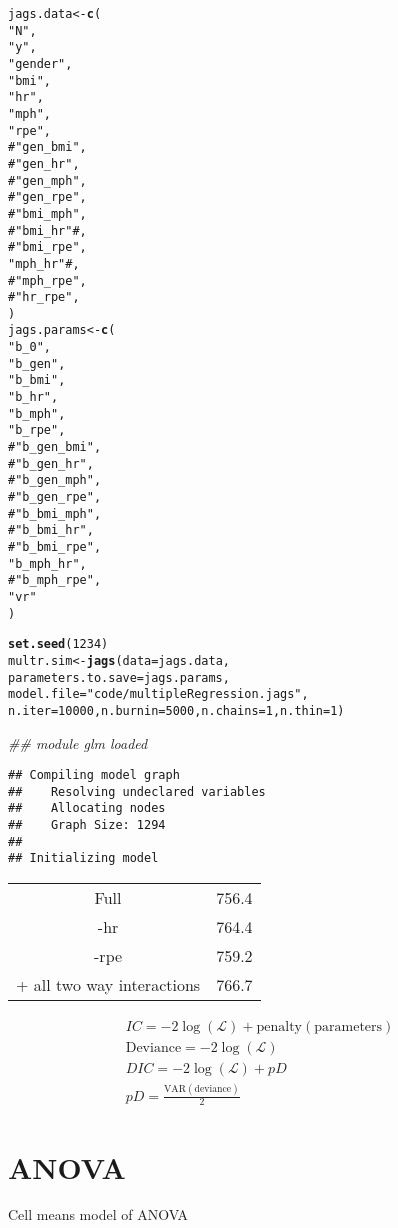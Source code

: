\documentclass[12pt,letterpaper,oneside]{article}\usepackage{graphicx, color}
\makeatletter
\newcommand{\hlfunctioncall}[1]{\textcolor[rgb]{0.501960784313725,0,0.329411764705882}{\textbf{#1}}}%
\newcommand{\hlstring}[1]{\textcolor[rgb]{0.6,0.6,1}{#1}}%
\newcommand{\hlcomment}[1]{\textcolor[rgb]{0.180392156862745,0.6,0.341176470588235}{#1}}%
\newenvironment{kframe}{%
 \def\at@end@of@kframe{}%
 \ifinner\ifhmode%
  \def\at@end@of@kframe{\end{minipage}}%
  \begin{minipage}{\columnwidth}%
 \fi\fi%
 \def\FrameCommand##1{\hskip\@totalleftmargin \hskip-\fboxsep
 \colorbox{shadecolor}{##1}\hskip-\fboxsep
     \hskip-\linewidth \hskip-\@totalleftmargin \hskip\columnwidth}%
 \MakeFramed {\advance\hsize-\width
   \@totalleftmargin\z@ \linewidth\hsize
   \@setminipage}}%
 {\par\unskip\endMakeFramed%
 \at@end@of@kframe}
\newenvironment{knitrout}{}{} %
\makeatother
\begin{document}
\begin{knitrout}
\begin{kframe}
\begin{alltt}
jags.data <- \hlfunctioncall{c}(
\hlstring{"N"},
\hlstring{"y"},
\hlstring{"gender"},
\hlstring{"bmi"},
\hlstring{"hr"},
\hlstring{"mph"},
\hlstring{"rpe"},
\hlcomment{# "gen_bmi",}
\hlcomment{# "gen_hr",}
\hlcomment{# "gen_mph",}
\hlcomment{# "gen_rpe",}
\hlcomment{# "bmi_mph",}
\hlcomment{# "bmi_hr" #,}
\hlcomment{# "bmi_rpe",}
\hlstring{"mph_hr"} #,
\hlcomment{# "mph_rpe",}
\hlcomment{# "hr_rpe",}
)
jags.params <- \hlfunctioncall{c}(
\hlstring{"b_0"},
\hlstring{"b_gen"},
\hlstring{"b_bmi"},
\hlstring{"b_hr"},
\hlstring{"b_mph"},
\hlstring{"b_rpe"},
\hlcomment{# "b_gen_bmi",}
\hlcomment{# "b_gen_hr",}
\hlcomment{# "b_gen_mph",}
\hlcomment{# "b_gen_rpe",}
\hlcomment{# "b_bmi_mph",}
\hlcomment{# "b_bmi_hr",}
\hlcomment{# "b_bmi_rpe",}
\hlstring{"b_mph_hr"},
\hlcomment{# "b_mph_rpe",}
\hlstring{"vr"}
)

\hlfunctioncall{set.seed}(1234)
multr.sim <- \hlfunctioncall{jags}(data=jags.data,
                   parameters.to.save=jags.params,
                   model.file=\hlstring{"code/multipleRegression.jags"},
                   n.iter=10000, n.burnin=5000, n.chains=1, n.thin=1)
\end{alltt}


{\ttfamily\noindent\itshape\textcolor{messagecolor}{\#\# module glm loaded}}\begin{verbatim}
## Compiling model graph
##    Resolving undeclared variables
##    Allocating nodes
##    Graph Size: 1294
## 
## Initializing model
\end{verbatim}
\end{kframe}
\end{knitrout}


\begin{tabular}{cc}
Full & 756.4\\
-hr & 764.4\\
-rpe & 759.2\\
+ all two way interactions & 766.7\\
\end{tabular}

\begin{align*}
    IC= -2\log(\mathcal{L}) + \text{penalty}(\text{parameters})\\
    \text{Deviance} = -2 \log(\mathcal{L})\\
    DIC = -2\log(\mathcal{L}) + pD\\
    pD = \frac{\text{VAR}(\text{deviance})}{2}
\end{align*}
\section{ANOVA} %
\label{sec:anova}
Cell means model of ANOVA
\end{document}
